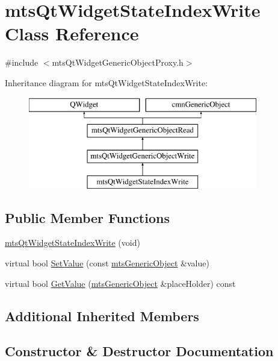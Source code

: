 \hypertarget{classmts_qt_widget_state_index_write}{}\section{mts\+Qt\+Widget\+State\+Index\+Write Class Reference}
\label{classmts_qt_widget_state_index_write}


{\ttfamily \#include $<$mts\+Qt\+Widget\+Generic\+Object\+Proxy.\+h$>$}

Inheritance diagram for mts\+Qt\+Widget\+State\+Index\+Write\+:\begin{figure}[H]
\begin{center}
\leavevmode
\includegraphics[height=4.000000cm]{d3/d4e/classmts_qt_widget_state_index_write}
\end{center}
\end{figure}
\subsection*{Public Member Functions}
\begin{DoxyCompactItemize}
\item 
\hyperlink{classmts_qt_widget_state_index_write_ae2e5c97746310aa684d79c4e9cd78793}{mts\+Qt\+Widget\+State\+Index\+Write} (void)
\item 
virtual bool \hyperlink{classmts_qt_widget_state_index_write_a2c4ce9b09af6a20760a8ab643b5a77f8}{Set\+Value} (const \hyperlink{classmts_generic_object}{mts\+Generic\+Object} \&value)
\item 
virtual bool \hyperlink{classmts_qt_widget_state_index_write_a93575bb6e0c92392d49d3066be509b2d}{Get\+Value} (\hyperlink{classmts_generic_object}{mts\+Generic\+Object} \&place\+Holder) const 
\end{DoxyCompactItemize}
\subsection*{Additional Inherited Members}


\subsection{Constructor \& Destructor Documentation}
\hypertarget{classmts_qt_widget_state_index_write_ae2e5c97746310aa684d79c4e9cd78793}{}
